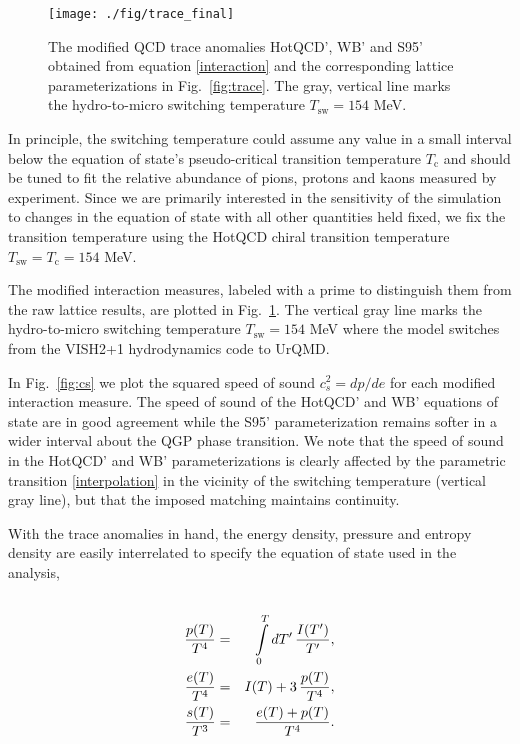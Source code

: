 \documentclass[aps,prc,reprint,amsmath,nofootinbib,superscriptaddress]{revtex4-1}
\begin{document}
\begin{figure}[b]
  \texttt{[image: ./fig/trace\_final]}
  \caption{\label{fig:trace_final} The modified QCD trace anomalies HotQCD', WB' and S95' obtained from equation \eqref{interaction} and the corresponding lattice
	  parameterizations in Fig.~\ref{fig:trace}. The gray, vertical line marks the hydro-to-micro switching temperature $T_\text{sw} = 154$ MeV.}
\end{figure}

In principle, the switching temperature could assume any value in a small interval below the equation of state's pseudo-critical transition temperature $T_\text{c}$ 
and should be tuned to fit the relative abundance of pions, protons and kaons measured by experiment. Since we are primarily interested in the sensitivity of the 
simulation to changes in the equation of state with all other quantities held fixed, we fix the transition temperature using the HotQCD chiral transition temperature 
$T_\text{sw} = T_\text{c} = 154$ MeV.
 
The modified interaction measures, labeled with a prime to distinguish them from the raw lattice results, are plotted in Fig.~\ref{fig:trace_final}. The vertical gray line 
marks the hydro-to-micro switching temperature $T_\text{sw}=154$ MeV where the model switches from the VISH2+1 hydrodynamics code to UrQMD. 

In Fig.~\ref{fig:cs} we plot the squared speed of sound $c_s^2 = dp / de$ for each modified interaction measure. The speed of sound of the HotQCD' and WB' equations
of state are in good agreement while the S95' parameterization remains softer in a wider interval about the QGP phase transition. We note that the speed of sound in 
the HotQCD' and WB' parameterizations is clearly affected by the parametric transition \eqref{interpolation} in the vicinity of the switching temperature (vertical gray line), 
but that the imposed matching maintains continuity.

With the trace anomalies in hand, the energy density, pressure and entropy density are easily interrelated to specify the equation of state used in the analysis,
\begin{eqnarray}
 \cr \frac{p(T)}{T^4} &=& \int\limits_0^T dT'\, \frac{I(T')}{T'}, \\
 \frac{e(T)}{T^4} &=& I(T) + 3\, \frac{p(T)}{T^4}, \\
 \frac{s(T)}{T^3} &=& \frac{e(T) + p(T)}{T^4}. 
\end{eqnarray}
 
\end{document}
